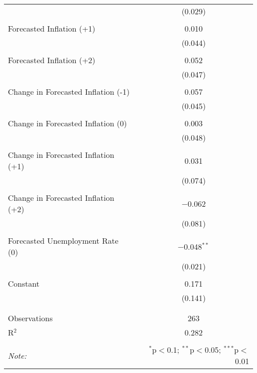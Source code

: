 \begin{table}[!htbp]
\begin{tabular}{@{\extracolsep{5pt}}lc}
  & (0.029) \\ 
  & \\ 
 Forecasted Inflation (+1) & 0.010 \\ 
  & (0.044) \\ 
  & \\ 
 Forecasted Inflation (+2) & 0.052 \\ 
  & (0.047) \\ 
  & \\ 
 Change in Forecasted Inflation (-1) & 0.057 \\ 
  & (0.045) \\ 
  & \\ 
 Change in Forecasted Inflation (0) & 0.003 \\ 
  & (0.048) \\ 
  & \\ 
 Change in Forecasted Inflation (+1) & 0.031 \\ 
  & (0.074) \\ 
  & \\ 
 Change in Forecasted Inflation (+2) & $-$0.062 \\ 
  & (0.081) \\ 
  & \\ 
 Forecasted Unemployment Rate (0) & $-$0.048$^{**}$ \\ 
  & (0.021) \\ 
  & \\ 
 Constant & 0.171 \\ 
  & (0.141) \\ 
  & \\ 
\hline \\[-1.8ex] 
Observations & 263 \\ 
R$^{2}$ & 0.282 \\ 
\hline 
\hline \\[-1.8ex] 
\textit{Note:}  & \multicolumn{1}{r}{$^{*}$p$<$0.1; $^{**}$p$<$0.05; $^{***}$p$<$0.01} \\ 
\end{tabular} 
\end{table} 
